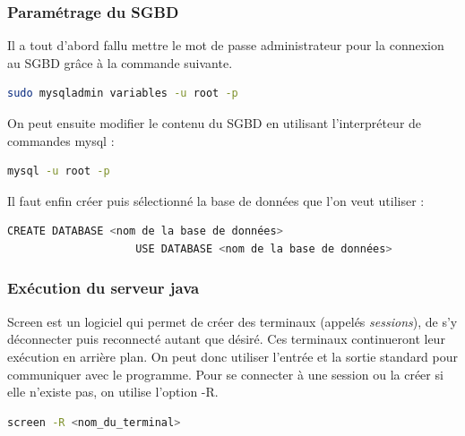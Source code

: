 \documentclass[a4paper, 11pt]{report}
\begin{document}
		\subsubsection{Paramétrage du SGBD}
			Il a tout d'abord fallu mettre le mot de passe administrateur pour la connexion au SGBD grâce à la commande suivante.
			\begin{mdframed}[backgroundcolor=light-gray, roundcorner=20pt,
				leftmargin=0, rightmargin=0, 
				innerleftmargin=20, linecolor=darkgray]
				\begin{lstlisting}[language=bash]
					sudo mysqladmin variables -u root -p
				\end{lstlisting}
			\end{mdframed}
			On peut ensuite modifier le contenu du SGBD en utilisant l'interpréteur de commandes mysql :
			\par
			\begin{mdframed}[backgroundcolor=light-gray, roundcorner=20pt,
				leftmargin=0, rightmargin=0, 
				innerleftmargin=20, linecolor=darkgray]
				\begin{lstlisting}[language=bash]
					mysql -u root -p
				\end{lstlisting}
			\end{mdframed}
			Il faut enfin créer puis sélectionné la base de données que l'on veut utiliser :
			\begin{mdframed}[backgroundcolor=light-gray, roundcorner=20pt,
				leftmargin=0, rightmargin=0, 
				innerleftmargin=20, linecolor=darkgray]
				\begin{lstlisting}[language=bash]
					CREATE DATABASE <nom de la base de données>
					USE DATABASE <nom de la base de données>
				\end{lstlisting}
			\end{mdframed}
		\subsubsection{Exécution du serveur java}
			Screen est un logiciel qui permet de créer des terminaux (appelés \emph{sessions}), de s'y déconnecter puis reconnecté autant que désiré.
			Ces terminaux continueront leur exécution en arrière plan. On peut donc utiliser l'entrée et la sortie standard pour communiquer avec le programme.
			Pour se connecter à une session ou la créer si elle n'existe pas, on utilise l'option -R.
			\begin{mdframed}[backgroundcolor=light-gray, roundcorner=20pt,
				leftmargin=0, rightmargin=0, 
				innerleftmargin=20, linecolor=darkgray]
				\begin{lstlisting}[language=bash]
					screen -R <nom_du_terminal>
				\end{lstlisting}
			\end{mdframed}
\end{document}
